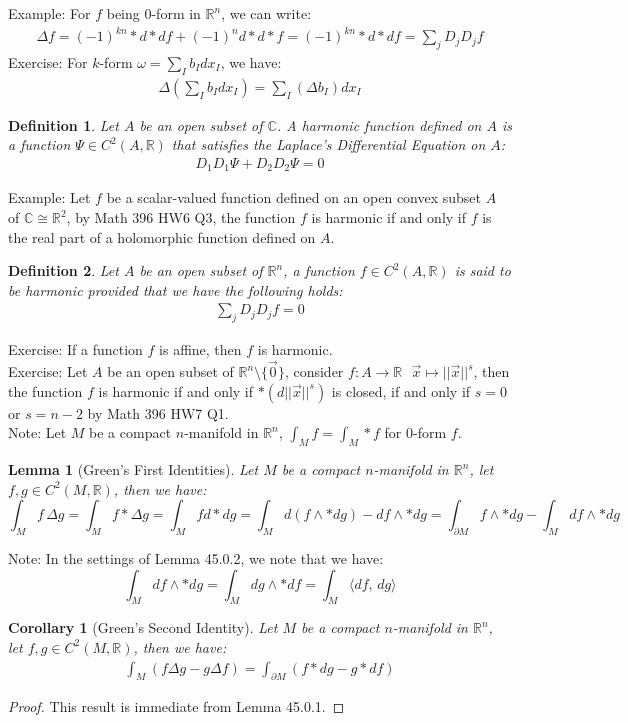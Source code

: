 \documentclass[11pt,oneside]{book}
\theoremstyle{break}
\theoremstyle{break}
\newtheorem{lem}{Lemma}[thm]
\newtheorem{corL}{Corollary}[lem]
\newtheorem{defn}{Definition}[corL]
\newcommand{\R}{\mathbb{R}}
\newcommand{\Complex}{\mathbb{C}}
\newcommand{\note}{\color{red}Note: \color{black}}
\newcommand{\example}{\color{green}Example: \color{black}}
\newcommand{\exercise}{\color{green}Exercise: \color{black}}
\begin{document}
\example
For $f$ being $0$-form in $\R^n$, we can write:
\begin{align*}
\Delta f = (-1)^{kn}*d*df +(-1)^n d*d*f = (-1)^{kn}*d*df = \sum_j D_j D_j f
\end{align*}
\exercise
For $k$-form $\omega = \sum_I b_I dx_I$, we have:
\begin{align*}
\Delta\left(\sum_I b_I dx_I\right) = \sum_I\left(\Delta b_I\right)dx_I
\end{align*}

\begin{defn}
Let $A$ be an open subset of $\Complex$. A harmonic function defined on $A$ is a function $\Psi \in C^2(A,\R)$ that satisfies the Laplace's Differential Equation on $A$:
\begin{align*}
D_1D_1 \Psi + D_2D_2 \Psi = 0
\end{align*}
\end{defn}

\example
Let $f$ be a scalar-valued function defined on an open convex subset $A$ of $\Complex \cong \R^2$, by Math 396 HW6 Q3, the function $f$ is harmonic if and only if $f$ is the real part of a holomorphic function defined on $A$.

\begin{defn}
Let $A$ be an open subset of $\R^n$, a function $f\in C^2(A,\R)$ is said to be harmonic provided that we have the following holds:
\begin{align*}
\sum_{j}D_j D_j f = 0
\end{align*}
\end{defn}

\exercise If a function $f$ is affine, then $f$ is harmonic.\\

\exercise Let $A$ be an open subset of $\R^n\setminus\{\vec{0}\}$, consider $f:A \to \R \ \ \ \vec{x}\mapsto ||\vec{x}||^s$, then the function $f$ is harmonic if and only if $*(d||\vec{x}||^s)$ is closed, if and only if $s = 0 $ or $s=n-2$ by Math 396 HW7 Q1.\\

\note Let $M$ be a compact $n$-manifold in $\R^n$, $\int_M f = \int_M *f$ for $0$-form $f$.

\begin{lem}[Green's First Identities]
Let $M$ be a compact $n$-manifold in $\R^n$, let $f,g\in C^2(M,\R)$, then we have:
$$\int_M f\,\Delta g = \int_M f*\Delta g = \int_M f d*dg = \int_M d(f\wedge *dg)- df \wedge *dg = \int_{\partial M}f\wedge *dg - \int_M df \wedge * dg $$
\end{lem}
\note In the settings of Lemma 45.0.2, we note that we have: 
$$ \int_M df \wedge * dg =  \int_M dg \wedge * df = \int_M \langle df,\, dg\rangle$$
\begin{corL}[Green's Second Identity]
Let $M$ be a compact $n$-manifold in $\R^n$, let $f,g\in C^2(M,\R)$, then we have:
\begin{align*}
\int_M (f\Delta g- g\Delta f) = \int_{\partial M}(f*dg - g*df)
\end{align*}
\end{corL}
\begin{proof}
This result is immediate from Lemma 45.0.1.
\end{proof}
\newpage
\end{document}
